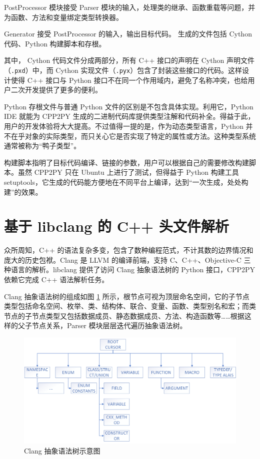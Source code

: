 PostProcessor 模块接受 Parser 模块的输入，处理类的继承、函数重载等问题，并为函数、方法和变量绑定类型转换器。

Generator 接受  PostProcessor 的输入，输出目标代码。 生成的文件包括 Cython 代码、Python 构建脚本和存根。

其中， Cython 代码文件分成两部分，所有 C++ 接口的声明在 Cython 声明文件（\lstinline{.pxd}）中，而 Cython 实现文件（\lstinline{.pyx}）包含了封装这些接口的代码。这样设计使得 C++ 接口与 Python 接口不在同一个作用域内，避免了名称冲突，也给用户二次开发提供了更多的便利。

Python 存根文件与普通 Python 文件的区别是不包含具体实现。利用它，Python IDE 就能为 CPP2PY 生成的二进制代码库提供类型注解和代码补全。得益于此，用户的开发体验将大大提高。不过值得一提的是，作为动态类型语言，Python 并不在乎对象的实际类型，而只关心它是否实现了特定的属性或方法。这种类型系统通常被称为“鸭子类型”。

构建脚本指明了目标代码编译、链接的参数，用户可以根据自己的需要修改构建脚本。虽然 CPP2PY 只在 Ubuntu 上进行了测试，但得益于 Python 构建工具 setuptools，它生成的代码能方便地在不同平台上编译，达到“一次生成，处处构建”的效果。

\section{基于 libclang 的 C++ 头文件解析}

众所周知，C++ 的语法复杂多变，包含了数种编程范式，不计其数的边界情况和庞大的历史包袱。Clang 是 LLVM 的编译前端，支持 C、C++、Objective-C 三种语言的解析。libclang\cite{libclang} 提供了访问 Clang 抽象语法树的 Python 接口，CPP2PY 依赖它完成 C++ 语法解析任务。

Clang 抽象语法树的组成如图 \ref{fig:2.2} 所示，根节点可视为顶层命名空间，它的子节点类型包括命名空间、枚举、类、结构体、联合、变量、函数、类型别名和宏；而类节点的子节点类型又包括数据成员、静态数据成员、方法、构造函数等……根据这样的父子节点关系，Parser 模块层层迭代遍历抽象语法树。

\begin{figure}
  \centering
  \includegraphics[width=\linewidth]{figures/ClangAST.png}
  \caption{Clang 抽象语法树示意图}
  \label{fig:2.2}
\end{figure}

